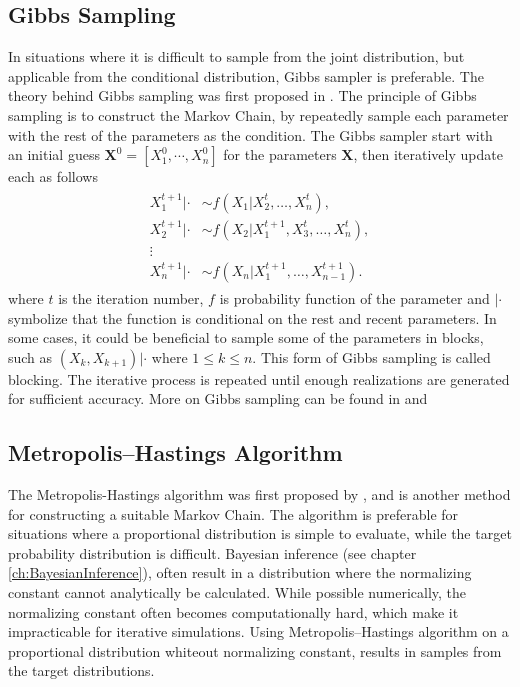 \subsection{Gibbs Sampling}
In situations where it is difficult to sample from the joint distribution, but applicable from the conditional distribution, Gibbs sampler is preferable. The theory behind Gibbs sampling was first proposed in \cite{GS}. The principle of Gibbs sampling is to construct the Markov Chain, by repeatedly sample each parameter with the rest of the parameters as the condition. The Gibbs sampler start with an initial guess $\boldsymbol{X}^{0}=[X_1^0,\cdots, X_n^0]$ for the parameters $\boldsymbol{X}$, then iteratively update each as follows
\begin{align}
\label{eq:gibbs}
\begin{split}
    X_1^{t+1}|\cdot& \sim f(X_1|X_2^{t},\dotsc,X_n^{t}),\\
    X_2^{t+1}|\cdot& \sim f(X_2|X_1^{t+1},X_3^{t},\dotsc,X_n^{t}),\\
    \vdots \\
    X_n^{t+1}|\cdot& \sim f(X_n|X_1^{t+1},\dotsc,X_{n-1}^{t+1}).
\end{split}
\end{align}
where $t$ is the iteration number, $f$ is probability function of the parameter and $|\cdot$ symbolize that the function is conditional on the rest and recent parameters. In some cases, it could be beneficial to sample some of the parameters in blocks, such as $(X_k,X_{k+1})|\cdot $ where $1\leq k \leq n$. This form of Gibbs sampling is called blocking.
The iterative process is repeated until enough realizations are generated for sufficient accuracy. More on Gibbs sampling can be found in \cite[p.~141]{MCMC} and \cite[p.~209]{compstat}

\subsection{Metropolis–Hastings Algorithm}
The Metropolis-Hastings algorithm was first proposed by \cite{MH}, and is another method for constructing a suitable Markov Chain. The algorithm is preferable for situations where a proportional distribution is simple to evaluate, while the target probability distribution is difficult. Bayesian inference (see chapter \ref{ch:BayesianInference}), often result in a distribution where the normalizing constant cannot analytically be calculated. While possible numerically, the normalizing constant often becomes computationally hard, which make it impracticable for iterative simulations. Using Metropolis–Hastings algorithm on a proportional distribution whiteout normalizing constant, results in samples from the target distributions. 

